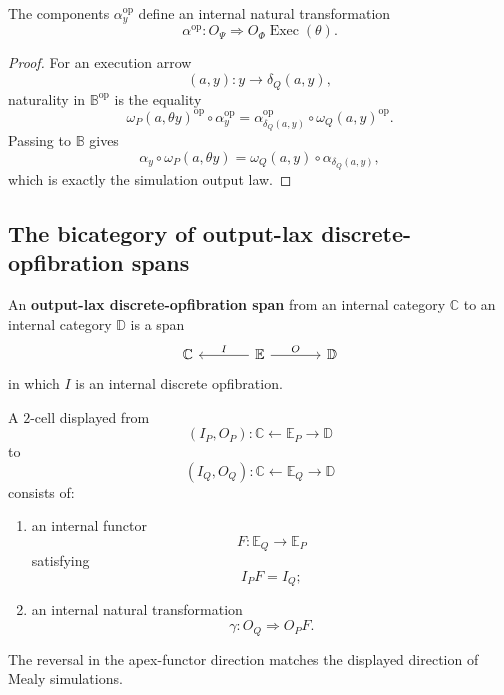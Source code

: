 \begin{proposition}
\label{prop:simulation-output-naturality}
The components \(\alpha_y^{\mathrm{op}}\) define an internal natural
transformation
\[
    \alpha^{\mathrm{op}}:
    O_\Psi
    \Longrightarrow
    O_\Phi\operatorname{Exec}(\theta).
\]
\end{proposition}

\begin{proof}
For an execution arrow
\[
    (a,y):y\to\delta_Q(a,y),
\]
naturality in \(\mathbb B^{\mathrm{op}}\) is the equality
\[
    \omega_P(a,\theta y)^{\mathrm{op}}
    \circ
    \alpha_y^{\mathrm{op}}
    =
    \alpha_{\delta_Q(a,y)}^{\mathrm{op}}
    \circ
    \omega_Q(a,y)^{\mathrm{op}}.
\]
Passing to \(\mathbb B\) gives
\[
    \alpha_y
    \circ
    \omega_P(a,\theta y)
    =
    \omega_Q(a,y)
    \circ
    \alpha_{\delta_Q(a,y)},
\]
which is exactly the simulation output law.
\end{proof}

\subsection{The bicategory of output-lax discrete-opfibration spans}
\label{subsec:bicategory-output-lax-dopf-spans}

\begin{definition}
\label{def:output-lax-dopf-span}
An \textbf{output-lax discrete-opfibration span} from an internal category
\(\mathbb C\) to an internal category \(\mathbb D\) is a span
\[
\begin{tikzcd}[column sep=large]
    \mathbb C
    &
    \mathbb E
        \arrow[l,"I"']
        \arrow[r,"O"]
    &
    \mathbb D
\end{tikzcd}
\]
in which \(I\) is an internal discrete opfibration.
\end{definition}

A \(2\)-cell displayed from
\[
    (I_P,O_P):\mathbb C\leftarrow\mathbb E_P\to\mathbb D
\]
to
\[
    (I_Q,O_Q):\mathbb C\leftarrow\mathbb E_Q\to\mathbb D
\]
consists of:
\begin{enumerate}
    \item an internal functor
    \[
        F:\mathbb E_Q\to\mathbb E_P
    \]
    satisfying
    \[
        I_PF=I_Q;
    \]
    \item an internal natural transformation
    \[
        \gamma:
        O_Q\Longrightarrow O_PF.
    \]
\end{enumerate}
The reversal in the apex-functor direction matches the displayed direction of
Mealy simulations.

